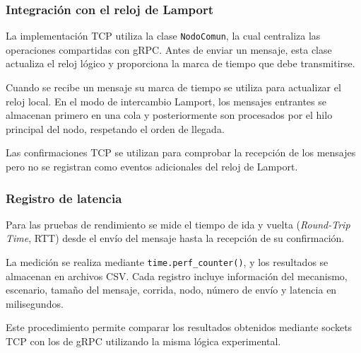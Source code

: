 \subsubsection{Integración con el reloj de Lamport}

La implementación TCP utiliza la clase \texttt{NodoComun},
la cual centraliza las operaciones compartidas con gRPC.
Antes de enviar un mensaje, esta clase actualiza el reloj
lógico y proporciona la marca de tiempo que debe
transmitirse.

Cuando se recibe un mensaje su marca de tiempo se utiliza
para actualizar el reloj local. En el modo de intercambio
Lamport, los mensajes entrantes se almacenan primero en
una cola y posteriormente son procesados por el hilo
principal del nodo, respetando el orden de llegada.

Las confirmaciones TCP se utilizan para comprobar la
recepción de los mensajes pero no se registran como
eventos adicionales del reloj de Lamport.

\subsubsection{Registro de latencia}

Para las pruebas de rendimiento se mide el tiempo de ida
y vuelta (\textit{Round-Trip Time}, RTT) desde el envío
del mensaje hasta la recepción de su confirmación.

La medición se realiza mediante
\texttt{time.perf\_counter()}, y los resultados se
almacenan en archivos CSV. Cada registro incluye
información del mecanismo, escenario, tamaño del mensaje,
corrida, nodo, número de envío y latencia en milisegundos.

Este procedimiento permite comparar los resultados
obtenidos mediante sockets TCP con los de gRPC
utilizando la misma lógica experimental.